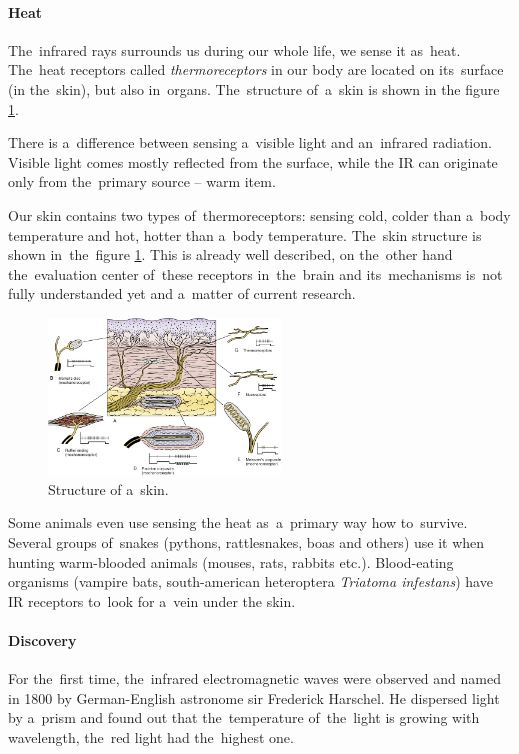 \paragraph{Heat}
The~infrared rays surrounds us during our whole life, we sense it as~heat. The~heat receptors called
{\it thermoreceptors} in our body are located on its~surface (in the~skin), but also in~organs.
The~structure of~a~skin is shown in the figure \ref{fig:skin}. 

There is a~difference between sensing a~visible light and an~infrared radiation. Visible light comes
mostly reflected from the surface, while the IR can originate only from the~primary source -- warm item.

Our skin contains two types of~thermoreceptors: sensing cold, colder than a~body temperature and
hot, hotter than a~body temperature. The~skin structure is shown in~the~figure \ref{fig:skin}.
This is already well described, on the~other hand the~evaluation center of~these receptors in~the~brain
and its~mechanisms is~not fully understanded yet and a~matter of current research. \cite{BodilySenses}

\begin{figure}[h!]
\begin{center}
\includegraphics[width=0.55\textwidth]{obrazky-figures/skin.jpg}
\caption{Structure of a~skin. \cite{SkinStructure}\label{fig:skin}}
\end{center}    
\end{figure}

Some animals even use sensing the heat as~a~primary way how to~survive. Several groups of~snakes
(pythons, rattlesnakes, boas and others) use it when hunting warm-blooded animals (mouses, rats, rabbits etc.).
Blood-eating organisms (vampire bats, south-american heteroptera {\it Triatoma infestans})
have IR receptors to~look for a~vein under the skin.\cite{SnakeInfrared}


\paragraph{Discovery}
For the~first time, the~infrared electromagnetic waves were observed and named in 1800 by German-English
astronome sir Frederick Harschel. He dispersed light by a~prism and found out that the~temperature
of~the~light is growing with wavelength, the~red light had the~highest one.

